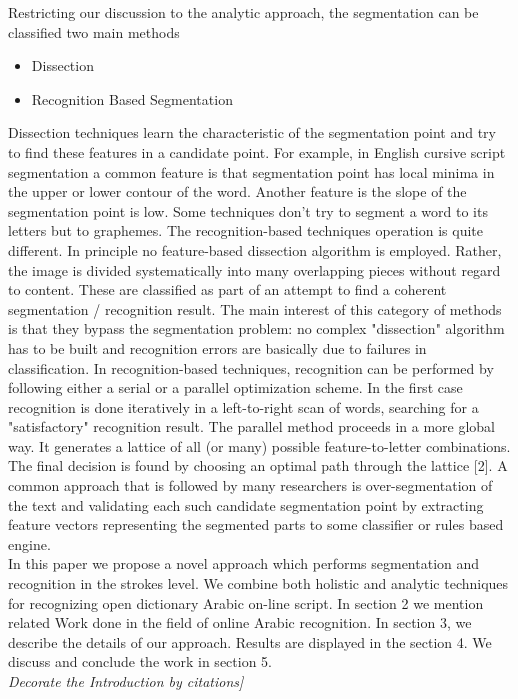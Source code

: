 \documentclass[12pt,journal,compsoc]{IEEEtran}
\begin{document}
Restricting our discussion to the analytic approach, the segmentation can be classified two main methods
\begin{itemize}
  \item Dissection
  \item Recognition Based Segmentation
\end{itemize}

Dissection techniques learn the characteristic of the segmentation point and try to find these features in a candidate point. For example, in English cursive script segmentation a common feature is that segmentation point has local minima in the upper or lower contour of the word. Another feature is the slope of the segmentation point is low. Some techniques don't try to segment a word to its letters but to graphemes. The recognition-based techniques operation is quite different. In principle no feature-based dissection algorithm is employed. Rather, the image is divided systematically into many overlapping pieces without regard to content. These are classified as part of an attempt to find a coherent segmentation / recognition result. The main interest of this category of methods is that they bypass the segmentation problem: no complex "dissection" algorithm has to be built and recognition errors are basically due to failures in classification. In recognition-based techniques, recognition can be performed by following either a serial or a parallel optimization scheme. In the first case recognition is done iteratively in a left-to-right scan of words, searching for a "satisfactory" recognition result. The parallel method proceeds in a more global way. It generates a lattice of all (or many) possible feature-to-letter combinations. The final decision is found by choosing an optimal path through the lattice [2]. A common approach that is followed by many researchers is over-segmentation of the text and validating each such candidate segmentation point by extracting feature vectors representing the segmented parts to some classifier or rules based engine.\cite{daifallah2009recognition}\\

In this paper we propose a novel approach which performs segmentation and recognition in the strokes level. We combine both holistic and analytic techniques for recognizing open dictionary Arabic on-line script. In section 2 we mention related Work done in the field of online Arabic recognition. In section 3, we describe the details of our approach. Results are displayed in the section 4. We discuss and conclude the work in section 5.
\\ \emph{Decorate the Introduction by citations]}
\end{document}

